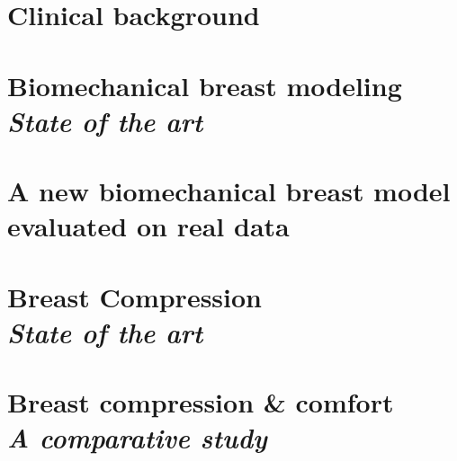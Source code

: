 \documentclass[a4paper,12pt,twoside]{report}
\begin{document}
\clearemptydoublepage



%


\chapter{ Clinical background}\label{chapter:clinicalbachground}


\clearemptydoublepage

\chapter{Biomechanical breast modeling\\ \textit{State of the art}}\label{chapter:bioMecaModelsBackground}


\clearemptydoublepage
\chapter{A new biomechanical breast model evaluated on real data}\label{chapter:myBioMecaModel}




\clearemptydoublepage
\chapter{Breast Compression\\ \textit{State of the art} }\label{chapter:compression:introduction}

\clearemptydoublepage

\chapter{Breast compression \& comfort \\ \textit{A comparative study}}
\label{chapter:compressionfem}

\end{document}
